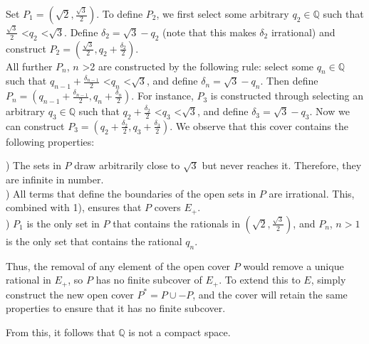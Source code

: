 \documentclass[12pt,leqno]{article}
\begin{document}
\medskip
Set $P_1 = (\sqrt{2}, \frac{\sqrt{3}}{2})$. To define $P_2$, we first select some arbitrary $q_2 \in \mathds{Q}$ such that $\frac{\sqrt{3}}{2}$ \textless $q_2$ \textless $\sqrt{3}$. Define $\delta_2 = \sqrt{3} - q_2$ (note that this makes $\delta_2$ irrational) and construct $P_2 = (\frac{\sqrt{3}}{2}, q_2 + \frac{\delta_2}{2})$. \\
\indent All further $P_n$, $n$ \textgreater 2 are constructed by the following rule: select some $q_n \in \mathds{Q}$ such that $q_{n-1} + \frac{\delta_{n-1}}{2}$ \textless $q_n$ \textless $\sqrt{3}$, and define $\delta_n = \sqrt{3} - q_n$. Then define $P_n = (q_{n-1}+ \frac{\delta_{n-1}}{2}, q_n + \frac{\delta_n}{2})$. For instance, $P_3$ is constructed through selecting an arbitrary $q_3 \in \mathds{Q}$ such that $q_2 + \frac{\delta_2}{2}$ \textless $q_3$ \textless $\sqrt{3}$, and define $\delta_3 = \sqrt{3} - q_3$. Now we can construct $P_3 = (q_2 + \frac{\delta_2}{2}, q_3 + \frac{\delta_3}{2})$. We observe that this cover contains the following properties:

\medskip
{}) The sets in $P$ draw arbitrarily close to $\sqrt{3}$ but never reaches it. Therefore, they are infinite in number.\\ 
) All terms that define the boundaries of the open sets in $P$ are irrational. This, combined with 1), ensures that $P$ covers $E_+$.\\
) $P_1$ is the only set in $P$ that contains the rationals in $(\sqrt{2}, \frac{\sqrt{3}}{2})$, and $P_n$, $n>1$ is the only set that contains the rational $q_n$. 

\medskip
\indent Thus, the removal of any element of the open cover $P$ would remove a unique rational in $E_+$, so $P$ has no finite subcover of $E_+$. To extend this to $E$, simply construct the new open cover $P^* = P \cup -P$, and the cover will retain the same properties to ensure that it has no finite subcover.

\medskip
From this, it follows that $\mathds{Q}$ is not a compact space.
\end{document}
